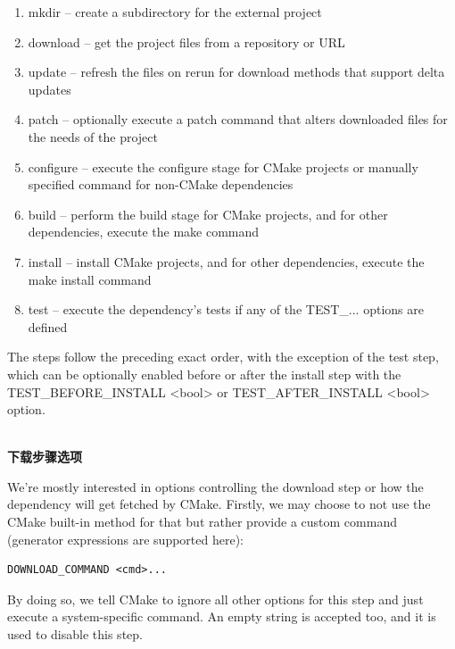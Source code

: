 \begin{enumerate}
\item 
mkdir – create a subdirectory for the external project

\item 
download – get the project files from a repository or URL

\item 
update – refresh the files on rerun for download methods that support delta updates

\item 
patch – optionally execute a patch command that alters downloaded files for the needs of the project

\item 
configure – execute the configure stage for CMake projects or manually specified command for non-CMake dependencies

\item 
build – perform the build stage for CMake projects, and for other dependencies, execute the make command

\item 
install – install CMake projects, and for other dependencies, execute the make install command

\item 
test – execute the dependency's tests if any of the TEST\_... options are defined
\end{enumerate}

The steps follow the preceding exact order, with the exception of the test step, which can be optionally enabled before or after the install step with the TEST\_BEFORE\_INSTALL <bool> or TEST\_AFTER\_INSTALL <bool> option.

\hspace*{\fill} \\ %
\noindent
\textbf{下载步骤选项}

We're mostly interested in options controlling the download step or how the dependency will get fetched by CMake. Firstly, we may choose to not use the CMake built-in method for that but rather provide a custom command (generator expressions are supported here):

\begin{lstlisting}[style=styleCMake]
DOWNLOAD_COMMAND <cmd>...
\end{lstlisting} 

By doing so, we tell CMake to ignore all other options for this step and just execute a system-specific command. An empty string is accepted too, and it is used to disable this step.

